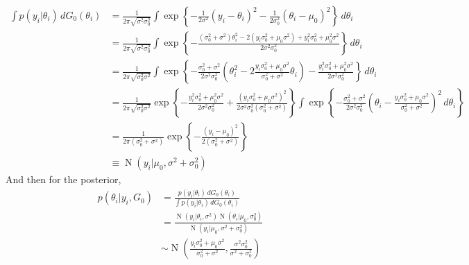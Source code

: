 \documentclass[11pt]{article}
\newcommand{\opn}{\operatorname}
\begin{document}
\begin{align}
  \int p\left(y_{i}|\theta_{i}\right)\,dG_{0}\left(\theta_{i}\right) &= \frac{1}{2\pi\sqrt{\sigma^{2}\sigma_{0}^{2}}}\int \exp \left\{-\frac{1}{2\sigma^{2}}\left(y_{i}-\theta_{i}\right)^{2} -\frac{1}{2\sigma_{0}^{2}}\left(\theta_{i}-\mu_{0}\right)^{2} \right\}\, d\theta_{i}\\
  &= \frac{1}{2\pi\sqrt{\sigma^{2}\sigma_{0}^{2}}}\int \exp\left\{-\frac{\left(\sigma_{0}^{2}+\sigma^{2}\right)\theta_{i}^{2} - 2\left(y_{i}\sigma_{0}^{2}+\mu_{0}\sigma^{2}\right) + y_{i}^{2}\sigma_{0}^{2}+\mu_{0}^{2}\sigma^{2}}{2\sigma^{2}\sigma_{0}^{2}} \right\}\,d\theta_{i}\\
  &= \frac{1}{2\pi\sqrt{\sigma_{0}^{2}\sigma^{2}}}\int \exp \left\{-\frac{\sigma_{0}^{2}+\sigma^{2}}{2\sigma^{2}\sigma_{0}^{2}}\left(\theta_{i}^{2} -2\frac{y_{i}\sigma_{0}^{2}+\mu_{0}\sigma^{2}}{\sigma_{0}^{2}+\sigma^{2}}\theta_{i}\right) - \frac{y_{i}^{2}\sigma_{0}^{2}+\mu_{0}^{2}\sigma^{2}}{2\sigma^{2}\sigma_{0}^{2}} \right\}\,d\theta_{i}\\
  &= \frac{1}{2\pi\sqrt{\sigma_{0}^{2}\sigma^{2}}}\exp\left\{-\frac{y_{i}^{2}\sigma_{0}^{2}+\mu_{0}^{2}\sigma^{2}}{2\sigma^{2}\sigma_{0}^{2}}+\frac{\left(y_{i}\sigma_{0}^{2} + \mu_{0}\sigma^{2}\right)^{2}}{2\sigma^{2}\sigma_{0}^{2}\left(\sigma_{0}^{2}+\sigma^{2}\right)} \right\} \int \exp\left\{-\frac{\sigma_{0}^{2}+\sigma^{2}}{2\sigma^{2}\sigma_{0}^{2}}\left(\theta_{i}-\frac{y_{i}\sigma_{0}^{2} + \mu_{0}\sigma^{2}}{\sigma_{0}^{2}+\sigma^{2}}\right)^{2}\,d\theta_{i} \right\}\\
  &= \frac{1}{2\pi\left(\sigma_{0}^{2}+\sigma^{2}\right)}\exp\left\{-\frac{\left(y_{i}-\mu_{0}\right)^{2}}{2\left(\sigma_{0}^{2}+\sigma^{2}\right)} \right\}\\
  &\equiv \opn{N}\left(y_{i}| \mu_{0}, \sigma^{2}+\sigma_{0}^{2}\right)
\end{align}
And then for the posterior,
\begin{align}
  p\left(\theta_{i}|y_{i},G_{0}\right) &= \frac{p\left(y_{i}|\theta_{i}\right)\,dG_{0}\left(\theta_{i}\right)}{\int p\left(y_{i}|\theta_{i}\right)\,dG_{0}\left(\theta_{i}\right)}\\
  &= \frac{\opn{N}\left(y_{i}|\theta_{i}, \sigma^{2}\right)\opn{N}\left(\theta_{i}|\mu_{0}, \sigma_{0}^{2}\right)}{\opn{N}\left(y_{i}|\mu_{0}, \sigma^{2}+\sigma_{0}^{2}\right)}\\
  &\sim \opn{N}\left(\frac{y_{i}\sigma_{0}^{2} + \mu_{0}\sigma^{2}}{\sigma_{0}^{2}+\sigma^{2}}, \frac{\sigma^{2}\sigma_{0}^{2}}{\sigma^{2}+\sigma_{0}^{2}}\right)
\end{align}
\end{document}
